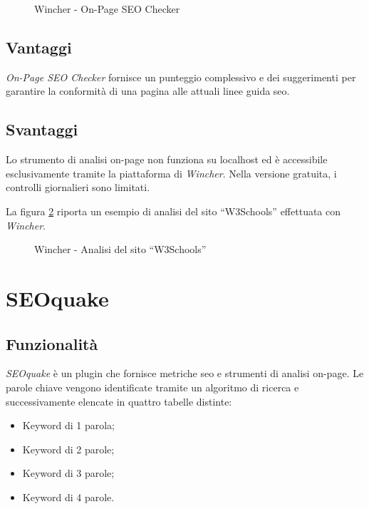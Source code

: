 \begin{figure}[H]
    \centering 
    \caption{Wincher - On-Page SEO Checker}
    \label{fig:on_page_seo_checker}
\end{figure}

\subsection{Vantaggi}
\textit{On-Page SEO Checker} fornisce un punteggio complessivo e dei suggerimenti per garantire la conformità di una pagina alle attuali linee guida \gls{seo}.

\subsection{Svantaggi}
Lo strumento di analisi \gls{on-page} non funziona su \gls{localhost} ed è accessibile esclusivamente tramite la piattaforma di \textit{Wincher}. Nella versione gratuita, i controlli giornalieri sono limitati.

\vspace{15pt}
\noindent La figura \ref{fig:wincher_w3schools} riporta un esempio di analisi del sito “W3Schools” effettuata con \textit{Wincher}.

\begin{figure}[H]
    \centering 
    \caption{Wincher - Analisi del sito “W3Schools”}
    \label{fig:wincher_w3schools}
\end{figure}

\section{SEOquake}

\subsection{Funzionalità}
\textit{SEOquake} è un plugin che fornisce metriche \gls{seo} e strumenti di analisi \gls{on-page}. Le parole chiave vengono identificate tramite un algoritmo di ricerca e successivamente elencate in quattro tabelle distinte:
\begin{itemize}
    \item Keyword di 1 parola;
    \item Keyword di 2 parole;
    \item Keyword di 3 parole;
    \item Keyword di 4 parole.
\end{itemize}

